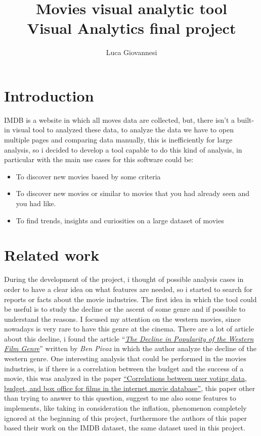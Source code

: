 \documentclass[]{article}
\title{%
	Movies visual analytic tool \\
	\large Visual Analytics final project}
\author{Luca Giovannesi}
\date{}
\newcommand{\quotes}[1]{``#1''}
\begin{document}
\maketitle

\section{Introduction}
IMDB is a website in which all moves data are collected, but, there isn't a built-in visual tool to analyzed these data, to analyze the data we have to open multiple pages and comparing data manually, this is inefficiently for large analysis, so i decided to develop a tool capable to do this kind of analysis, in particular with the main use cases for this software could be:
\begin{itemize}
	\item To discover new movies based by some criteria
	\item To discover new movies or similar to movies that you had already seen and you had like.
	\item To find trends, insights and curiosities on a large dataset of movies
\end{itemize}
\section{Related work}
During the development of the project, i thought of possible analysis cases in order to have a clear idea on what features are needed, so i started to search for reports or facts about the movie industries.\newline
The first idea in which the tool could be useful is to study the decline or the ascent of some genre and if possible to understand the reasons. I focused my attention on the western movies, since nowadays is very rare to have this genre at the cinema. There are a lot of article about this decline, i found the article \quotes{\emph{\href{https://screenculturejournal.com/2017/04/the-decline-in-popularity-of-the-western-film-genre/}{The Decline in Popularity of the Western Film Genre}}} written by \emph{Ben Pivoz} in which the author analyze the decline of the western genre.\newline\newline
One interesting analysis that could be performed in the movies industries, is if there is a correlation between the budget and the success of a movie, this was analyzed in the paper \href{https://asistdl.onlinelibrary.wiley.com/doi/full/10.1002/asi.23213}{\quotes{Correlations between user voting data, budget, and box office for films in the internet movie database}}, this paper other than trying to answer to this question, suggest to me also some features to implements, like taking in consideration the inflation, phenomenon completely ignored at the beginning of this project, furthermore the authors of this paper based their work on the IMDB dataset, the same dataset used in this project.
\end{document}
